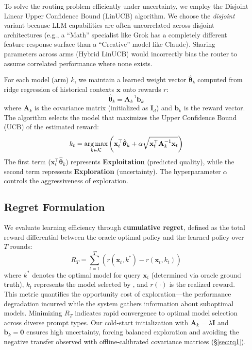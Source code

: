 To solve the routing problem efficiently under uncertainty, we employ the Disjoint Linear Upper Confidence Bound (LinUCB) algorithm. We choose the \emph{disjoint} variant because LLM capabilities are often uncorrelated across disjoint architectures (e.g., a ``Math'' specialist like Grok has a completely different feature-response surface than a ``Creative'' model like Claude). Sharing parameters across arms (Hybrid LinUCB) would incorrectly bias the router to assume correlated performance where none exists.

For each model (arm) $k$, we maintain a learned weight vector $\hat{\boldsymbol{\theta}}_k$ computed from ridge regression of historical contexts $\mathbf{x}$ onto rewards $r$:
\begin{equation}
\hat{\boldsymbol{\theta}}_k = \mathbf{A}_k^{-1} \mathbf{b}_k
\end{equation}
where $\mathbf{A}_k$ is the covariance matrix (initialized as $\mathbf{I}_d$) and $\mathbf{b}_k$ is the reward vector. The algorithm selects the model that maximizes the Upper Confidence Bound (UCB) of the estimated reward:
\begin{equation}
k_t = \operatorname*{arg\,max}_{k \in \mathcal{K}} \left( \mathbf{x}_t^\top \hat{\boldsymbol{\theta}}_k + \alpha \sqrt{\mathbf{x}_t^\top \mathbf{A}_k^{-1} \mathbf{x}_t} \right)
\end{equation}
The first term ($\mathbf{x}_t^\top \hat{\boldsymbol{\theta}}_k$) represents \textbf{Exploitation} (predicted quality), while the second term represents \textbf{Exploration} (uncertainty). The hyperparameter $\alpha$ controls the aggressiveness of exploration.

\subsection{Regret Formulation}
\label{sec:regret}

We evaluate learning efficiency through \textbf{cumulative regret}, defined as the total reward differential between the oracle optimal policy and the learned policy over $T$ rounds:
\begin{equation}
R_T = \sum_{t=1}^T \left( r(\mathbf{x}_t, k^*) - r(\mathbf{x}_t, k_t) \right)
\end{equation}
where $k^*$ denotes the optimal model for query $\mathbf{x}_t$ (determined via oracle ground truth), $k_t$ represents the model selected by \ours{}, and $r(\cdot)$ is the realized reward. This metric quantifies the opportunity cost of exploration---the performance degradation incurred while the system gathers information about suboptimal models. Minimizing $R_T$ indicates rapid convergence to optimal model selection across diverse prompt types. Our cold-start initialization with $\mathbf{A}_k = \lambda \mathbf{I}$ and $\mathbf{b}_k = \mathbf{0}$ ensures high uncertainty, forcing balanced exploration and avoiding the negative transfer observed with offline-calibrated covariance matrices (\S\ref{sec:rq1}).

